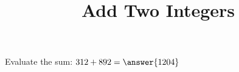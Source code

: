 \documentclass{ximera}
\title{Add Two Integers}
\begin{document}
\maketitle
Evaluate the sum:
$
312+892=\answer{1204}
$
\end{document}
